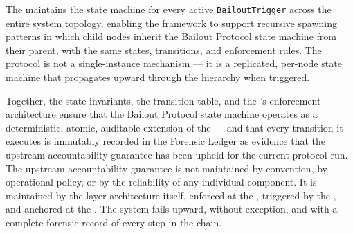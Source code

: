 The \fact{} maintains the state machine for every active \texttt{BailoutTrigger} across the entire system topology, enabling the framework to support recursive spawning patterns in which child nodes inherit the Bailout Protocol state machine from their parent, with the same states, transitions, and enforcement rules. The protocol is not a single-instance mechanism — it is a replicated, per-node state machine that propagates upward through the hierarchy when triggered.

Together, the state invariants, the transition table, and the \fact's enforcement architecture ensure that the Bailout Protocol state machine operates as a deterministic, atomic, auditable extension of the \fact{} — and that every transition it executes is immutably recorded in the Forensic Ledger as evidence that the upstream accountability guarantee has been upheld for the current protocol run. The upstream accountability guarantee is not maintained by convention, by operational policy, or by the reliability of any individual component. It is maintained by the layer architecture itself, enforced at the \fact{}, triggered by the \bounds{}, and anchored at the \purpose{}. The system fails upward, without exception, and with a complete forensic record of every step in the chain.
